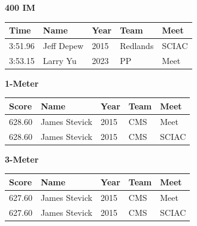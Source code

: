 \vspace{1.2em}
\noindent\begin{minipage}[t]{0.98\textwidth}
\centering
\textbf{\textcolor{teamprimary}{400 IM}}\par
\vspace{0.5em}
\centering
\small
\renewcommand{\arraystretch}{1.0}
\setlength{\tabcolsep}{4pt}
\begin{tabular}{@{}p{2.5cm}p{4.5cm}p{1.5cm}p{2.5cm}p{2.5cm}@{}}
\toprule
\textbf{Time} & \textbf{Name} & \textbf{Year} & \textbf{Team} & \textbf{Meet} \\
\midrule
3:51.96 & Jeff Depew & 2015 & Redlands & SCIAC \\
3:53.15 & Larry Yu & 2023 & PP & Meet \\
\bottomrule
\end{tabular}
\end{minipage}
\vspace{1.2em}
\noindent\begin{minipage}[t]{0.98\textwidth}
\centering
\textbf{\textcolor{teamprimary}{1-Meter}}\par
\vspace{0.5em}
\centering
\small
\renewcommand{\arraystretch}{1.0}
\setlength{\tabcolsep}{4pt}
\begin{tabular}{@{}p{2.5cm}p{4.5cm}p{1.5cm}p{2.5cm}p{2.5cm}@{}}
\toprule
\textbf{Score} & \textbf{Name} & \textbf{Year} & \textbf{Team} & \textbf{Meet} \\
\midrule
628.60 & James Stevick & 2015 & CMS & Meet \\
628.60 & James Stevick & 2015 & CMS & SCIAC \\
\bottomrule
\end{tabular}
\end{minipage}
\vspace{1.2em}
\noindent\begin{minipage}[t]{0.98\textwidth}
\centering
\textbf{\textcolor{teamprimary}{3-Meter}}\par
\vspace{0.5em}
\centering
\small
\renewcommand{\arraystretch}{1.0}
\setlength{\tabcolsep}{4pt}
\begin{tabular}{@{}p{2.5cm}p{4.5cm}p{1.5cm}p{2.5cm}p{2.5cm}@{}}
\toprule
\textbf{Score} & \textbf{Name} & \textbf{Year} & \textbf{Team} & \textbf{Meet} \\
\midrule
627.60 & James Stevick & 2015 & CMS & Meet \\
627.60 & James Stevick & 2015 & CMS & SCIAC \\
\bottomrule
\end{tabular}
\end{minipage}

